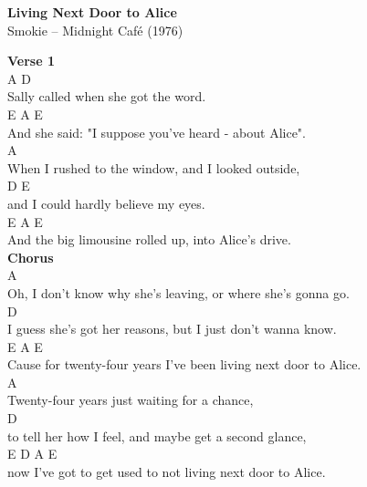 \documentclass[a4paper]{article}
\begin{document}
    \begin{center}
        \textbf{Living Next Door to Alice}
        ~\\
        Smokie -- Midnight Café (1976)
    \end{center}
    {
        \scriptsize
        \textbf{Verse 1}
        ~\\
        {
            \cutive
            \obeyspaces
A                                   D
\\
Sally called when she got the word.
\\
                                      E      A     E
\\
And she said: "I suppose you've heard - about Alice".
\\
       A
\\
When I rushed to the window, and I looked outside,
\\
D                             E
\\
and I could hardly believe my eyes.
\\
   E                                A           E
\\
And the big limousine rolled up, into Alice's drive.
\\

        }
        \textbf{Chorus}
        ~\\
        {
            \cutive
            \obeyspaces
      A
\\
Oh, I don't know why she's leaving, or where she's gonna go.
\\
  D
\\
I guess she's got her reasons, but I just don't wanna know.
\\
          E                                               A    E
\\
Cause for twenty-four years I've been living next door to Alice.
\\
A
\\
Twenty-four years just waiting for a chance,
\\
   D
\\
to tell her how I feel, and maybe get a second glance,
\\
         E                      D                   A    E
\\
now I've got to get used to not living next door to Alice.
\\

}}
\end{document}
